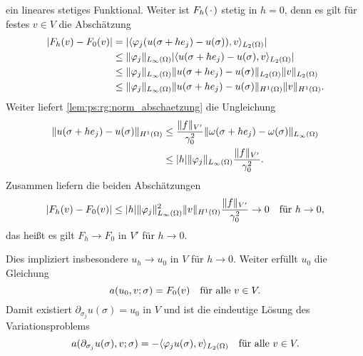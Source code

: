 \begin{Satz}
\begin{Beweis}
\begin{equation}
        \end{equation}
        ein lineares stetiges Funktional.
        Weiter ist $F_{h}(\blank)$ stetig in $h = 0$, denn es gilt für festes $v \in V$ die Abschätzung
        \begin{align}
            \abs{F_{h}(v) - F_{0}(v)}
            &= \abs{\skp{\varphi_{j} (u(\sigma + h e_{j}) - u(\sigma))}{v}{L_{2}(\Omega)}}
            \\&\leq \norm{\varphi_{j}}_{L_{\infty}(\Omega)} \abs{\skp{u(\sigma + h e_{j}) - u(\sigma)}{v}{L_{2}(\Omega)}}
            \\&\leq \norm{\varphi_{j}}_{L_{\infty}(\Omega)} \norm{u(\sigma + h e_{j}) - u(\sigma)}_{L_{2}(\Omega)} \norm{v}_{L_{2}(\Omega)}
            \\&\leq \norm{\varphi_{j}}_{L_{\infty}(\Omega)} \norm{u(\sigma + h e_{j}) - u(\sigma)}_{H^{1}(\Omega)} \norm{v}_{H^{1}(\Omega)}.
        \end{align}
        Weiter liefert \cref{lem:ps:rg:norm_abschaetzung} die Ungleichung
        \begin{align}
            \norm{u(\sigma + h e_{j}) - u(\sigma)}_{H^{1}(\Omega)}
            &\leq \frac{\norm{f}_{V'}}{\gamma_{0}^{2}} \norm{\omega(\sigma + h e_{j}) - \omega(\sigma)}_{L_{\infty}(\Omega)}
            \\&\leq \abs{h} \norm{\varphi_{j}}_{L_{\infty}(\Omega)} \frac{\norm{f}_{V'}}{\gamma_{0}^{2}}.
        \end{align}
        Zusammen liefern die beiden Abschätzungen
        \begin{equation}
            \abs{F_{h}(v) - F_{0}(v)} \leq \abs{h} \norm{\varphi_{j}}^{2}_{L_{\infty}(\Omega)} \norm{v}_{H^{1}(\Omega)} \frac{\norm{f}_{V'}}{\gamma_{0}^{2}} \to 0 \quad \text{für}~h \to 0,
        \end{equation}
        das heißt es gilt $F_{h} \to F_{0}$ in $V'$ für $h \to 0$.

        Dies impliziert insbesondere $u_{h} \to u_{0}$ in $V$ für $h \to 0$.
        Weiter erfüllt $u_{0}$ die Gleichung
        \begin{equation}
            a(u_{0}, v; \sigma) = F_{0}(v) \quad \fa v \in V.
        \end{equation}
        Damit existiert $\partial_{\sigma_{j}} u(\sigma) = u_{0}$ in $V$ und ist die eindeutige Lösung des Variationsproblems
        \begin{equation}
            a(\partial_{\sigma_{j}} u(\sigma), v; \sigma) = - \skp{\varphi_{j} u(\sigma)}{v}{L_{2}(\Omega)} \quad \fa v \in V.
        \end{equation}


\end{Beweis}
\end{Satz}
